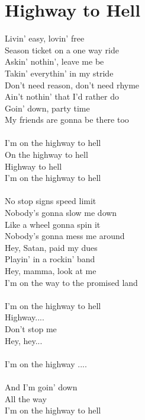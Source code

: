 \section{Highway to Hell}
Livin' easy, lovin' free\\
Season ticket on a one way ride\\
Askin' nothin', leave me be\\
Takin' everythin' in my stride\\
Don't need reason, don't need rhyme\\
Ain't nothin' that I'd rather do\\
Goin' down, party time\\
My friends are gonna be there too\\
\\
I'm on the highway to hell\\
On the highway to hell\\
Highway to hell\\
I'm on the highway to hell\\
\\
No stop signs speed limit\\
Nobody's gonna slow me down\\
Like a wheel gonna spin it\\
Nobody's gonna mess me around\\
Hey, Satan, paid my dues\\
Playin' in a rockin' band\\
Hey, mamma, look at me\\
I'm on the way to the promised land\\
\\
I'm on the highway to hell\\
Highway....
\\
Don't stop me\\
Hey, hey...\\
\\
I'm on the highway ....\\
\\
And I'm goin' down\\
All the way\\
I'm on the highway to hell\\